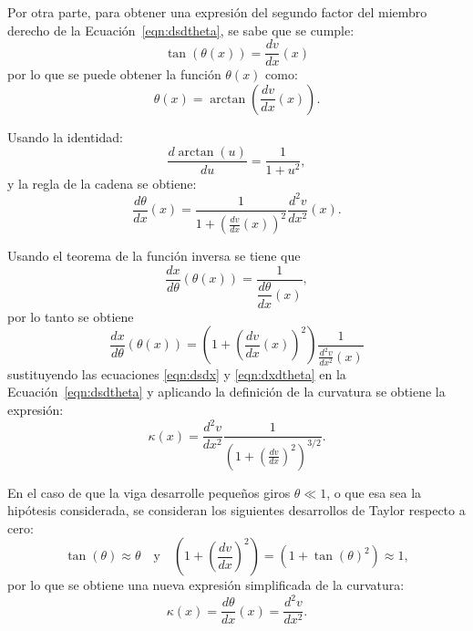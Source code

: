 Por otra parte, para obtener una expresión del segundo factor del miembro derecho de la Ecuación~\eqref{eqn:dsdtheta}, se sabe que se cumple:
%
\begin{equation}
\tan(\theta(x) ) = \frac{d v}{d x} (x)
\end{equation}
%
por lo que se puede obtener la función $\theta(x)$ como:
%
\begin{equation}
\theta(x) = \arctan \left( \frac{d v}{d x} (x) \right).
\end{equation}

Usando la identidad:
%
\begin{equation}
\frac{d \arctan (u)}{d u} = \frac{1}{1+ u^2},
\end{equation}
%
y la regla de la cadena se obtiene:
\begin{equation}
\frac{d \theta }{d x} (x) = \frac{1}{ 1 + \left( \frac{dv}{dx} (x)\right)^2} \frac{d^2 v}{d x^2}(x) .
\end{equation}

Usando el teorema de la función inversa se tiene que 
$$
\frac{d x}{d\theta}\left( \theta(x) \right) = \frac{1}{\dfrac{d \theta}{dx}(x)},
$$
por lo tanto se obtiene
%
\begin{equation}\label{eqn:dxdtheta}
\frac{d x}{d\theta}(\theta(x)) =  \left( 1 + \left( \frac{dv}{dx} (x)\right)^2 \right)  \frac{1}{  \frac{d^2 v}{d x^2}(x)}
\end{equation}
%
sustituyendo las ecuaciones \eqref{eqn:dsdx} y \eqref{eqn:dxdtheta} en la Ecuación~\ref{eqn:dsdtheta} y aplicando la definición de la curvatura se obtiene la expresión:
%
\begin{equation}
\kappa(x) = \frac{d^2 v}{d x^2} \frac{1}{\left( 1+ \left( \frac{dv}{d x}\right)^2 \right)^{3/2}}.
\end{equation}
%

En el caso de que la viga desarrolle pequeños giros $\theta \ll 1 $, o que esa sea la hipótesis considerada, se consideran los siguientes desarrollos de Taylor respecto a cero:
%
\begin{equation}
\tan(\theta) \approx \theta  \quad \text{y}\quad \left( 1+ \left( \frac{dv}{d x}\right)^2 \right) = (1 + \tan(\theta)^2 ) \approx 1,
\end{equation}
%
por lo que se obtiene una nueva expresión simplificada de la curvatura:
%
\begin{equation}\label{eqn:defcurv}
\kappa (x) =  \frac{d\theta}{d x}(x) = \frac{d^2 v}{d x^2}.
\end{equation}

